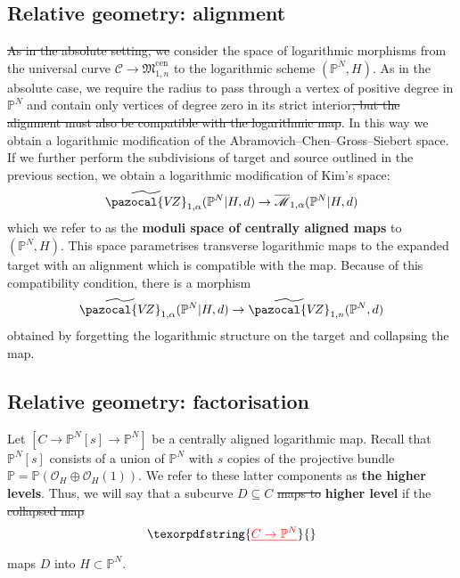 \documentclass[11pt]{amsart}
\newcommand{\PP}{\mathbb P}
\newcommand{\VZ}{\pazocal{V\!Z}}
\renewcommand{\to}{\rightarrow}
\newcommand{\Mcal}{\mathcal{M}}
\newcommand{\ol}[1]{\overline{#1}}
\theoremstyle{definition}
\theoremstyle{definition}
\providecommand{\DIFaddtex}[1]{{\protect\color{blue}\uwave{#1}}} %
\providecommand{\DIFdeltex}[1]{{\protect\color{red}\sout{#1}}}                      %
\providecommand{\DIFaddbegin}{} %
\providecommand{\DIFaddend}{} %
\providecommand{\DIFdelbegin}{} %
\providecommand{\DIFdelend}{} %
\providecommand{\DIFadd}[1]{\texorpdfstring{\DIFaddtex{#1}}{#1}} %
\providecommand{\DIFdel}[1]{\texorpdfstring{\DIFdeltex{#1}}{}} %
\begin{document}
\subsection{Relative geometry: alignment} \DIFdelbegin \DIFdel{As in the absolute setting, we }\DIFdelend \DIFaddbegin \DIFadd{We }\DIFaddend consider the space of logarithmic morphisms from the universal curve $\mathcal{C} \to \mathfrak{M}_{1,n}^{\mathrm{cen}}$ to the logarithmic scheme $(\PP^N,H)$. As in the absolute case, we require the radius to pass through a vertex of positive degree in $\PP^N$ and contain only vertices of degree zero in its strict interior\DIFdelbegin \DIFdel{, but the alignment must also be compatible with the logarithmic map}\DIFdelend . In this way we obtain a logarithmic modification of the Abramovich--Chen--Gross--Siebert space. If we further perform the subdivisions of target and source outlined in the previous section, we obtain a logarithmic modification of Kim's space:
\begin{equation*} \widetilde\VZ_{1,\alpha}(\PP^N|H,d) \to \ol\Mcal_{1,\alpha}(\PP^N|H,d)\end{equation*}
which we refer to as the \textbf{moduli space of centrally aligned maps} to $(\PP^N,H)$. This space parametrises transverse logarithmic maps to the expanded target with an alignment which is compatible with the map. Because of this compatibility condition, there is a morphism
\begin{equation*} \widetilde\VZ_{1,\alpha}(\PP^N|H,d) \to \widetilde\VZ_{1,n}(\PP^N,d)\end{equation*}
obtained by forgetting the logarithmic structure on the target and collapsing the map.


\subsection{Relative geometry: factorisation}\label{subsection factorisation} Let $[C\to \mathbb P^N[s]\to \mathbb P^N]$ be a centrally aligned logarithmic map. Recall that $\mathbb P^N[s]$ consists of a union of $\mathbb P^N$ with $s$ copies of the projective bundle $\mathbb{P} = \mathbb P(\mathcal O_H\oplus \mathcal O_H(1))$. We refer to these latter components as \textbf{the higher levels}. Thus, we will say that a subcurve $D\subseteq C$ \DIFdelbegin \DIFdel{maps to }\DIFdelend \textbf{\DIFaddbegin \DIFadd{maps to }\DIFaddend higher level} if the \DIFdelbegin \DIFdel{collapsed map
}\[
\DIFdel{C\to \mathbb P^N
}\]
\DIFdelend \DIFaddbegin \DIFadd{composite $C\to \mathbb P^N$ }\DIFaddend maps $D$ into $H\subset \mathbb P^N$. 
\end{document}
